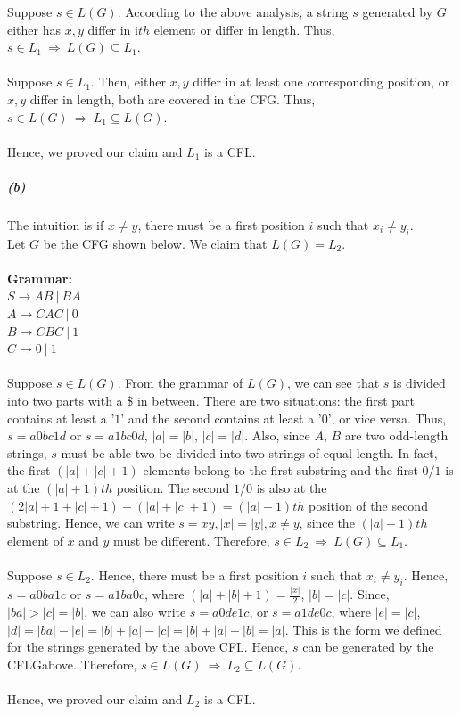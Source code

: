 \documentclass[letterpaper, 12pt]{article}
\theoremstyle{definition}
\numberwithin{equation}{section}
\begin{document}
Suppose $s \in L(G)$. According to the above analysis, a string $s$ generated by $G$ either has $x,y$ differ in i$th$ element or differ in length. Thus, $s \in L_1\ \Rightarrow\ L(G) \subseteq L_1$. \\~\\

Suppose $s \in L_1$. Then, either $x,y$ differ in at least one corresponding position, or $x, y$ differ in length, both are covered in the CFG. Thus, $s \in L(G)\ \Rightarrow\ L_1 \subseteq L(G)$. \\~\\

Hence, we proved our claim and $L_1$ is a CFL.


\newpage
\subparagraph{(b)} The intuition is if $x \neq y$, there must be a first position $i$ such that $x_i \neq y_i$. \\
Let $G$ be the CFG shown below. We claim that $L(G) = L_2$. \\~\\
\textbf{Grammar:} \\
$S \rightarrow AB\ |\ BA$ \\
$A \rightarrow CAC\ |\ 0$ \\
$B \rightarrow CBC\ |\ 1$ \\
$C \rightarrow 0\ |\ 1 $ \\~\\


Suppose $s \in L(G)$. From the grammar of $L(G)$, we can see that $s$ is divided into two parts with a \$ in between. There are two situations: the first part contains at least a '$1$' and the second contains at least a '$0$', or vice versa. Thus, $s=a0bc1d$ or $s=a1bc0d$, $|a|=|b|$, $|c|=|d|$. Also, since $A$, $B$ are two odd-length strings, $s$ must be able two be divided into two strings of equal length. In fact, the first $(|a|+|c|+1)$ elements belong to the first substring and the first $0/1$ is at the $(|a|+1)th$ position. The second $1/0$ is also at the $(2|a|+1+|c|+1) - (|a|+|c|+1) = (|a|+1)th$ position of the second substring. Hence, we can write $s=xy, |x|=|y|, x\neq y$, since the $(|a|+1)th$ element of $x$ and $y$ must be different. Therefore, $s \in L_2\ \Rightarrow\ L(G) \subseteq L_1$. \\~\\

Suppose $s \in L_2$. Hence, there must be a first position $i$ such that $x_i \neq y_i$. Hence, $s=a0ba1c$ or $s=a1ba0c$, where $(|a|+|b|+1) = \frac{|x|}{2}$, $|b| = |c|$. Since, $|ba| > |c| = |b|$, we can also write $s=a0de1c$, or $s=a1de0c$, where $|e|=|c|$, $|d|=|ba|-|e|=|b|+|a|-|c|=|b|+|a|-|b|=|a|$. This is the form we defined for the strings generated by the above CFL. Hence, $s$ can be generated by the CFLGabove. Therefore, $s \in L(G)\ \Rightarrow\ L_2 \subseteq L(G)$. \\~\\

Hence, we proved our claim and $L_2$ is a CFL.
\end{document}
